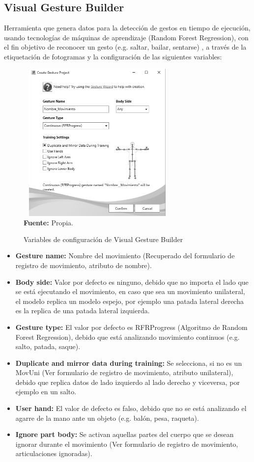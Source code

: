 \subsection{Visual Gesture Builder} \label{ins:VisualGestureBuilder}
Herramienta que genera datos para la detecci\'on de gestos en tiempo de ejecuci\'on, usando tecnolog\'ias de m\'aquinas de aprendizaje (Random Forest Regression), con el fin objetivo de reconocer un gesto (e.g. saltar, bailar, sentarse) \cite{KinectBuilder2019}, a trav\'es de la etiquetaci\'on de fotogramas y la configuraci\'on de las siguientes variables:
 \begin{figure}[H]
	\caption{Variables de configuraci\'on de Visual Gesture Builder}
	\label{fig:visualGesture}
	\centering
	\includegraphics[width=300px,height=300px]{graphics/settingsGesture.PNG} \\
	\textbf{Fuente:} Propia.
\end{figure} 
\begin{itemize}
\item \textbf{Gesture name:} Nombre del movimiento  (Recuperado del formulario de registro de movimiento, atributo de nombre).
\item \textbf{Body side:} Valor por defecto es  ninguno, debido que no importa el lado que se est\'a ejecutando el movimiento, en caso que sea un movimiento unilateral, el modelo replica un modelo espejo, por ejemplo una patada lateral derecha es la replica de una patada lateral izquierda.
\item \textbf{Gesture type:} El valor por defecto es RFRProgress (Algoritmo de Random Forest Regression), debido que est\'a analizando movimiento continuos (e.g. salto, patada, saque).
\item \textbf{Duplicate and mirror data during training:} Se selecciona, si no es un \gls{MovUni} (Ver formulario de registro de movimiento, atributo unilateral), debido que replica datos de lado izquierdo al lado derecho y viceversa, por ejemplo en un salto.
\item \textbf{User hand:} El valor de defecto es falso, debido que no se est\'a analizando el agarre de la mano ante un objeto (e.g. bal\'on, pesa, raqueta).
\item \textbf{Ignore part body:} Se activan  aquellas partes del cuerpo que se desean ignorar durante el movimiento (Ver formulario de registro de movimiento, articulaciones ignoradas).
\end{itemize}
